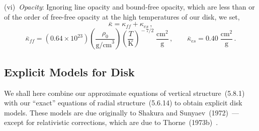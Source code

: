 (vi)~\textit{Opacity}: Ignoring line opacity and bound-free opacity, which are less than
or of the order of free-free opacity at the high temperatures of our disk, we set,
%
\begin{equation}
\tag{5.8.1e}
\bar{\kappa} = \kappa_{ff} + \kappa_{es}\,,
\end{equation}
%
\begin{equation}
\bar{\kappa}_{ff}
= (0.64 \times 10^{23})
  \left(\frac{\rho_0}{\text{g/cm}^3}\right)
  \left(\frac{T}{\text{K}}\right)^{\!-7/2}
  \;\frac{\text{cm}^2}{\text{g}}\,,
\qquad
\bar{\kappa}_{es} = 0.40\;\frac{\text{cm}^2}{\text{g}}\,.
\end{equation}



\subsection{Explicit Models for Disk}
\label{sec:5.9}

We shall here combine our approximate equations of vertical structure~(5.8.1)
with our ``exact'' equations of radial structure~(5.6.14) to obtain explicit disk
models.  These models are due originally to Shakura and Sunyaev~(1972)~\cite{ShakuraSunyaev1972}---except
for relativistic corrections, which are due to Thorne~(1973b)~\cite{Thorne1973b}.

